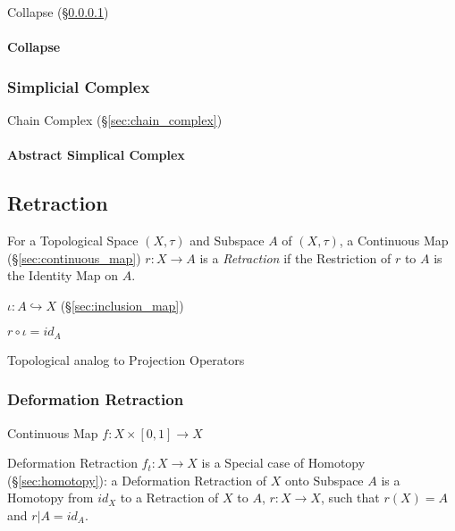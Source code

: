 Collapse (\S\ref{sec:collapse})



\paragraph{Collapse}\label{sec:collapse}



\subsubsection{Simplicial Complex}\label{sec:simplicial_complex}

Chain Complex (\S\ref{sec:chain_complex})



\paragraph{Abstract Simplical Complex}\label{sec:abstract_complex}



\subsection{Retraction}\label{sec:subspace_retraction}

For a Topological Space $(X, \tau)$ and Subspace $A$ of $(X,\tau)$, a
Continuous Map (\S\ref{sec:continuous_map}) $r : X \rightarrow A$ is a
\emph{Retraction} if the Restriction of $r$ to $A$ is the Identity Map
on $A$.

$\iota : A \hookrightarrow X$ (\S\ref{sec:inclusion_map})

$r \circ \iota = id_A$

Topological analog to Projection Operators %
\cite{hatcher02}



\subsubsection{Deformation Retraction}\label{sec:deformation_retraction}

Continuous Map $f : X \times [0,1] \rightarrow X$

Deformation Retraction $f_t : X \rightarrow X$ is a Special case of
Homotopy (\S\ref{sec:homotopy}): a Deformation Retraction of $X$ onto
Subspace $A$ is a Homotopy from $id_X$ to a Retraction of $X$ to $A$,
$r : X \rightarrow X$, such that $r(X) = A$ and $r | A = id_A$.
\cite{hatcher02}



